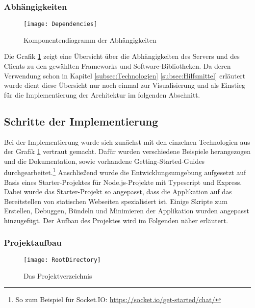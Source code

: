 \subsubsection{Abhängigkeiten}
\begin{figure}[htp]
	\centering
	\captionsetup{justification=centering}
	\texttt{[image: Dependencies]}
	\caption[Abhängigkeiten]{Komponentendiagramm der Abhängigkeiten}
	\label{fig:ComponentDependencies}
\end{figure}
\noindent Die Grafik \ref{fig:ComponentDependencies} zeigt eine Übersicht über die Abhängigkeiten des Servers und des Clients zu den gewählten Frameworks und Software-Bibliotheken. Da deren Verwendung schon in Kapitel \ref{subsec:Technologien} \bzw \ref{subsec:Hilfsmittel} erläutert wurde dient diese Übersicht nur noch einmal zur Visualisierung und als Einstieg für die Implementierung der Architektur im folgenden Abschnitt.
\subsection{Schritte der Implementierung}
\label{subsec:Implementierung}
Bei der Implementierung wurde sich zunächst mit den einzelnen Technologien aus der Grafik \ref{fig:ComponentDependencies} vertraut gemacht. Dafür wurden verschiedene Beispiele herangezogen und die Dokumentation, sowie \ggf vorhandene Getting-Started-Guides durchgearbeitet.\footnote{So zum Beispiel für Socket.IO: \url{https://socket.io/get-started/chat/}}
Anschließend wurde die Entwicklungsumgebung aufgesetzt auf Basis eines Starter-Projektes für Node.js-Projekte mit Typescript und Express.\cite{typescript_node_starter} Dabei wurde das Starter-Projekt so angepasst, dass die Applikation auf das Bereitstellen von statischen Webseiten spezialisiert ist. Einige Skripte zum Erstellen, Debuggen, Bündeln und Minimieren der Applikation wurden angepasst \bzw hinzugefügt. Der Aufbau des Projektes wird im Folgenden näher erläutert.

\subsubsection{Projektaufbau}

\begin{figure}[htp]
	\centering
	\captionsetup{justification=centering}
	\texttt{[image: RootDirectory]}
	\caption[Projektverzeichnis]{Das Projektverzeichnis}
	\label{fig:RootDirectory}
\end{figure}

